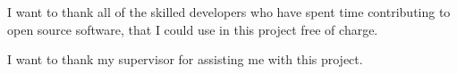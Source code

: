 \documentclass[../report.tex]{subfiles}
\begin{document}
I want to thank all of the skilled developers who have spent time contributing to open source software, that I could use in this project free of charge.

I want to thank my supervisor for assisting me with this project.
\end{document}
